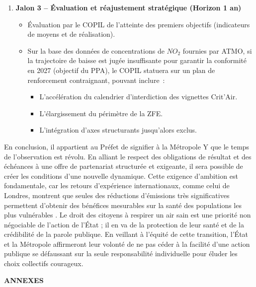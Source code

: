 \documentclass[12pt,a4paper]{article}
\begin{document}
\begin{enumerate}
    \item \textbf{Jalon 3 – Évaluation et réajustement stratégique (Horizon 1 an)}
    \begin{itemize}[label=\textbullet, leftmargin=*]
        \item Évaluation par le COPIL de l'atteinte des premiers objectifs (indicateurs de moyens et de réalisation).
        \item Sur la base des données de concentrations de $NO_2$ fournies par ATMO, si la trajectoire de baisse est jugée insuffisante pour garantir la conformité en 2027 (objectif du PPA), le COPIL statuera sur un plan de renforcement contraignant, pouvant inclure~:
        \begin{itemize}[label=\textendash, leftmargin=*]
            \item L'accélération du calendrier d'interdiction des vignettes Crit'Air.
            \item L'élargissement du périmètre de la ZFE.
            \item L'intégration d'axes structurants jusqu'alors exclus.
        \end{itemize}
    \end{itemize}
\end{enumerate}

En conclusion, il appartient au Préfet de signifier à la Métropole Y que le temps de l'observation est révolu. En alliant le respect des obligations de résultat et des échéances à une offre de partenariat structurée et exigeante, il sera possible de créer les conditions d'une nouvelle dynamique. Cette exigence d'ambition est fondamentale, car les retours d'expérience internationaux, comme celui de Londres, montrent que seules des réductions d'émissions très significatives permettent d'obtenir des bénéfices mesurables sur la santé des populations les plus vulnérables  \parencite{mudwayImpactLondonsLow2019}. Le droit des citoyens à respirer un air sain est une priorité non négociable de l'action de l'État ; il en va de la protection de leur santé et de la crédibilité de la parole publique. En veillant à l'équité de cette transition, l'État et la Métropole affirmeront leur volonté de ne pas céder à la facilité d'une action publique se défaussant sur la seule responsabilité individuelle \parencite{boutaric2014} pour éluder les choix collectifs courageux.

\newpage

\begin{center}
\textbf{ANNEXES}
\end{center}
\end{document}
